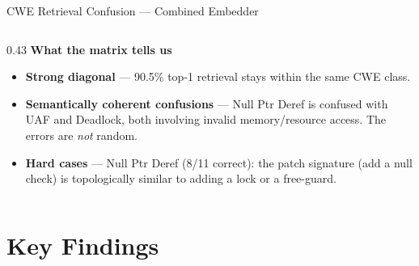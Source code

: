 \documentclass[aspectratio=169,10pt]{beamer}
\begin{document}
\begin{frame}{CWE Retrieval Confusion — Combined Embedder}
\begin{columns}[T]
\begin{column}{0.43\textwidth}
  \textbf{What the matrix tells us}

  \vspace{0.5em}
  \begin{itemize}
    \item \textbf{Strong diagonal} — 90.5\% top-1 retrieval stays within the same CWE class.
    \item \textbf{Semantically coherent confusions} — Null Ptr Deref is confused with UAF and Deadlock, both involving invalid memory/resource access. The errors are \emph{not} random.
    \item \textbf{Hard cases} — Null Ptr Deref (8/11 correct): the patch signature (add a null check) is topologically similar to adding a lock or a free-guard.
  \end{itemize}

\end{column}
\end{columns}
\end{frame}

\section{Key Findings}
\end{document}
